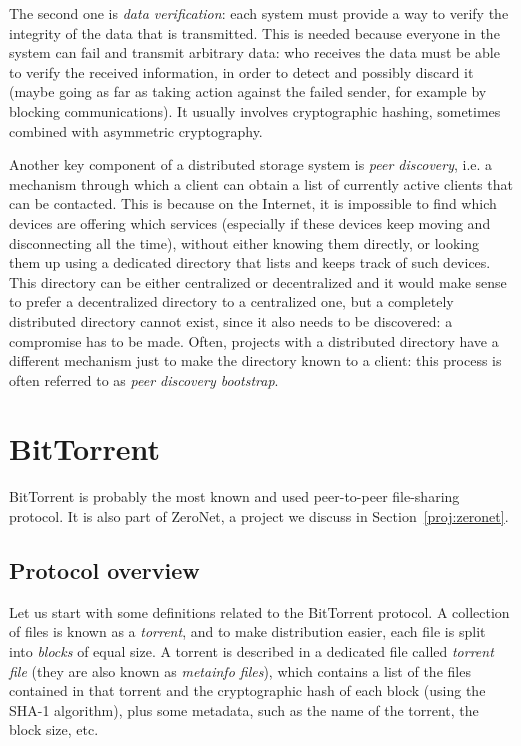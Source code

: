 \documentclass[mscthesis]{usiinfthesis}
\begin{document}
The second one is \emph{data verification}: each system must provide a way to verify the integrity of the data that is transmitted. This is needed because everyone in the system can fail and transmit arbitrary data: who receives the data must be able to verify the received information, in order to detect and possibly discard it (maybe going as far as taking action against the failed sender, for example by blocking communications). It usually involves cryptographic hashing, sometimes combined with asymmetric cryptography.

Another key component of a distributed storage system is \emph{peer discovery}, i.e. a mechanism through which a client can obtain a list of currently active clients that can be contacted. This is because on the Internet, it is impossible to find which devices are offering which services (especially if these devices keep moving and disconnecting all the time), without either knowing them directly, or looking them up using a dedicated directory that lists and keeps track of such devices. This directory can be either centralized or decentralized and it would make sense to prefer a decentralized directory to a centralized one, but a completely distributed directory cannot exist, since it also needs to be discovered: a compromise has to be made. Often, projects with a distributed directory have a different mechanism just to make the directory known to a client: this process is often referred to as \textit{peer discovery bootstrap}.

\section{BitTorrent}\label{proj:bittorrent}

BitTorrent is probably the most known and used peer-to-peer file-sharing protocol. It is also part of ZeroNet, a project we discuss in Section~\ref{proj:zeronet}.

\subsection{Protocol overview}

Let us start with some definitions related to the BitTorrent protocol. A collection of files is known as a \emph{torrent}, and to make distribution easier, each file is split into \emph{blocks} of equal size. A torrent is described in a dedicated file called \emph{torrent file} (they are also known as \textit{metainfo files}), which contains a list of the files contained in that torrent and the cryptographic hash of each block (using the SHA-1 algorithm), plus some metadata, such as the name of the torrent, the block size, etc.
\end{document}
